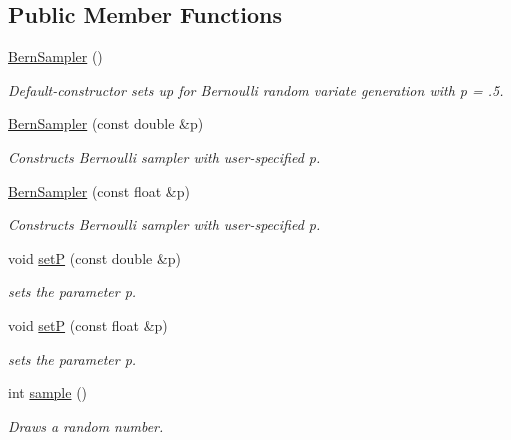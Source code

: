 \subsection*{Public Member Functions}
\begin{DoxyCompactItemize}
\item 
\mbox{\label{classrvsamp_1_1BernSampler_a4401c2717776040550e555ec3ae48ee2}} 
\hyperlink{classrvsamp_1_1BernSampler_a4401c2717776040550e555ec3ae48ee2}{Bern\+Sampler} ()
\begin{DoxyCompactList}\small\item\em Default-\/constructor sets up for Bernoulli random variate generation with p = .5. \end{DoxyCompactList}\item 
\hyperlink{classrvsamp_1_1BernSampler_ab71d1320b26f2ea63b1a7adc4183db3b}{Bern\+Sampler} (const double \&p)
\begin{DoxyCompactList}\small\item\em Constructs Bernoulli sampler with user-\/specified p. \end{DoxyCompactList}\item 
\hyperlink{classrvsamp_1_1BernSampler_a3e48a918a7be355435ae1ab425974c6d}{Bern\+Sampler} (const float \&p)
\begin{DoxyCompactList}\small\item\em Constructs Bernoulli sampler with user-\/specified p. \end{DoxyCompactList}\item 
void \hyperlink{classrvsamp_1_1BernSampler_ad6020e9f9f62a9ab32e64638cc29880b}{setP} (const double \&p)
\begin{DoxyCompactList}\small\item\em sets the parameter p. \end{DoxyCompactList}\item 
void \hyperlink{classrvsamp_1_1BernSampler_a115d668c1eb9e13a98c5d5f265a26ba2}{setP} (const float \&p)
\begin{DoxyCompactList}\small\item\em sets the parameter p. \end{DoxyCompactList}\item 
int \hyperlink{classrvsamp_1_1BernSampler_aa12177f8517a1462d84e5fd964c7dadb}{sample} ()
\begin{DoxyCompactList}\small\item\em Draws a random number. \end{DoxyCompactList}\end{DoxyCompactItemize}
